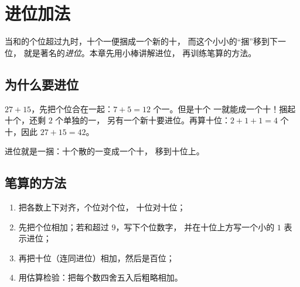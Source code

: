 \chapter{进位加法}\label{ch:g2:addition}

当和的个位超过九时，十个一便捆成一个新的十，
而这个小小的“捆”移到下一位，
就是著名的\emph{进位}。本章先用小棒讲解进位，
再训练笔算的方法。

\section{为什么要进位}

\begin{example}[十个一捆]\label{ex:g2:addition:bundle}
$27 + 15$，先把个位合在一起：$7 + 5 = 12$ 个一。但是十个
一就能成一个十！捆起十个，还剩 $2$ 个单独的一，
另有一个新十要进位。再算十位：$2 + 1 + 1 = 4$ 个十，因此
$27 + 15 = 42$。
\end{example}

\begin{omfigure}

{\small 进位就是一捆：十个散的一变成一个十，
移到十位上。}
\end{omfigure}

\section{笔算的方法}

\begin{method}[竖式加法]\label{met:g2:addition:column}
\begin{enumerate}
  \item 把各数上下对齐，个位对个位，
        十位对十位；
  \item 先把个位相加；若和超过 $9$，写下个位数字，
        并在十位上方写一个小的 $1$ 表示进位；
  \item 再把十位（连同进位）相加，然后是百位；
  \item 用估算检验：把每个数四舍五入后粗略相加。
\end{enumerate}
\end{method}

